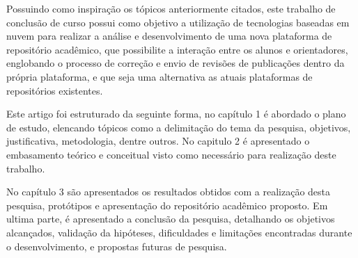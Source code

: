 Possuindo como inspiração os tópicos anteriormente citados,
este trabalho de conclusão de curso possui como objetivo a utilização
de tecnologias baseadas em nuvem para realizar a análise e
desenvolvimento de uma nova plataforma de repositório acadêmico,
que possibilite a interação entre os alunos e orientadores,
englobando o processo de correção e envio de revisões
de publicações dentro da própria plataforma, e que seja uma alternativa
as atuais plataformas de repositórios existentes.

Este artigo foi estruturado da seguinte forma, no capítulo 1
é abordado o plano de estudo, elencando tópicos como a delimitação
do tema da pesquisa, objetivos, justificativa, metodologia, dentre outros.
No capitulo 2 é apresentado o embasamento teórico e conceitual
visto como necessário para realização deste trabalho.

No capítulo 3 são apresentados os resultados obtidos com a realização desta
pesquisa, protótipos e apresentação do repositório acadêmico proposto.
Em ultima parte, é apresentado a conclusão da pesquisa,
detalhando os objetivos alcançados, validação da hipóteses, dificuldades
e limitações encontradas durante o desenvolvimento, e propostas futuras
de pesquisa.